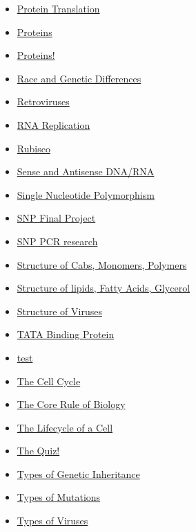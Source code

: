 \documentclass[11pt]{article}
\begin{document}
\begin{itemize}
\begin{itemize}
\begin{itemize}
\item \href{biology/bio10/KBhBIO101Translation.org}{Protein Translation}
\item \href{biology/bio10/KBhBIO101Proteins.org}{Proteins}
\item \href{biology/bio10/KBe20bio101refProteinsIndex.org}{Proteins!}
\item \href{biology/bio10/KBhBIO101RaceAndGenetics.org}{Race and Genetic Differences}
\item \href{biology/bio10/KBhBIO101Retroviruses.org}{Retroviruses}
\item \href{biology/bio10/KBhBIO101RNAReplication.org}{RNA Replication}
\item \href{biology/bio10/KBrefRubisco.org}{Rubisco}
\item \href{biology/bio10/KBhBIO101SenseAndAntisense.org}{Sense and Antisense DNA/RNA}
\item \href{biology/bio10/KBhBIO101SNP.org}{Single Nucleotide Polymorphism}
\item \href{biology/bio10/KBxSNPFinal.org}{SNP Final Project}
\item \href{biology/bio10/KBxSNPPCR.org}{SNP PCR research}
\item \href{biology/bio10/KBhBIO101StructuresofCarbs.org}{Structure of Cabs, Monomers, Polymers}
\item \href{biology/bio10/KBhBIO101StructuresOfLipids.org}{Structure of lipids, Fatty Acids, Glycerol}
\item \href{biology/bio10/KBhBIO101StructureOfViruses.org}{Structure of Viruses}
\item \href{biology/bio10/KBhBIO101TATABinding.org}{TATA Binding Protein}
\item \href{biology/bio10/test.org}{test}
\item \href{biology/bio10/KBhBIO101CellCycle.org}{The Cell Cycle}
\item \href{biology/bio10/KBhBIO101CoreRuleofBio.org}{The Core Rule of Biology}
\item \href{biology/bio10/KBhBIO101CellLifecycle.org}{The Lifecycle of a Cell}
\item \href{biology/bio10/KBxLittleMoreBIO.org}{The Quiz!}
\item \href{biology/bio10/KBhBIO101GeneticInheritance.org}{Types of Genetic Inheritance}
\item \href{biology/bio10/KBhBIO101TypesOfMutations.org}{Types of Mutations}
\item \href{biology/bio10/KBhBIO101TypesOfViruses.org}{Types of Viruses}

\end{itemize}
\end{itemize}
\end{itemize}
\end{document}
